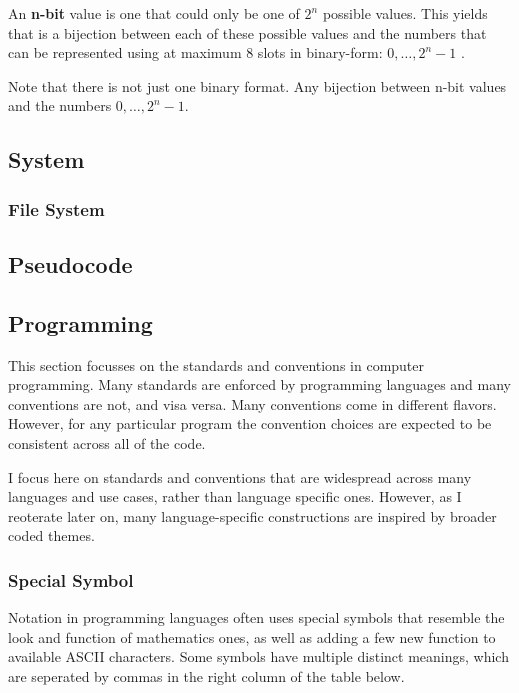 \documentclass{article}
\newcommand{\definition}[1]{
	\vspace{10px}
	\noindent {[\sc Definition]} #1
	\vspace{10px}
}
\begin{document}
	\definition{An \textbf{n-bit} value is one that could only be one of $2^n$ possible values. This yields that is a bijection between each of these possible values and the numbers that can be represented using at maximum 8 slots in binary-form: $0, \dots, 2^n-1$}.

	Note that there is not just one binary format. Any bijection between n-bit values and the numbers $0, \dots, 2^n-1$.

\subsection{System}

\subsubsection{File System}
\subsubsection{}

\subsection{Pseudocode}


\subsection{Programming}

	This section focusses on the standards and conventions in computer programming. Many standards are enforced by programming languages and many conventions are not, and visa versa. Many conventions come in different flavors. However, for any particular program the convention choices are expected to be consistent across all of the code.

	I focus here on standards and conventions that are widespread across many languages and use cases, rather than language specific ones. However, as I reoterate later on, many language-specific constructions are inspired by broader coded themes.

\subsubsection{Special Symbol}
	Notation in programming languages often uses special symbols that resemble the look and function of mathematics ones, as well as adding a few new function to available ASCII characters. Some symbols have multiple distinct meanings, which are seperated by commas in the right column of the table below.
\end{document}
